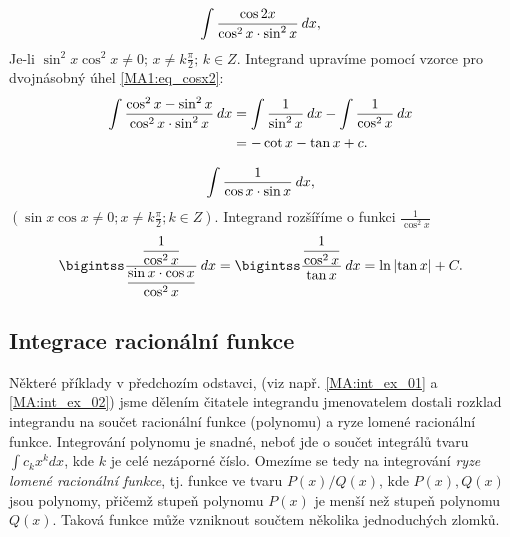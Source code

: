 {\begin{example}
      \end{example}
      
      \begin{example}
        \begin{equation}\label{MA:int_ex_07} 
          \int\frac{\cos2x}{\cos^2x\cdot\sin^2x}\hspace{2pt}dx, 
        \end{equation} 
        Je-li \(\sin^2x\cos^2x\neq0;\, x\neq k\frac{\pi}{2};\, k\in Z\).
        Integrand upravíme pomocí vzorce pro dvojnásobný úhel \ref{MA1:eq_cosx2}:
        \begin{align*}
          \int\frac{\cos^2x-\sin^2x}{\cos^2x\cdot\sin^2x}\hspace{2pt}dx 
             &= \int\frac{1}{\sin^2x}\hspace{2pt}dx -\int\frac{1}{\cos^2x}\hspace{2pt}dx        \\
             &= -\cot x - \tan x + c. 
        \end{align*}
      \end{example}
      
      \begin{example}
       \begin{equation}\label{MA:int_ex_08}
         \int\frac{1}{\cos x\cdot\sin x}\hspace{2pt}dx, 
       \end{equation}
       \((\sin x\cos x\neq0; x\neq k\frac{\pi}{2}; k\in Z)\).
       Integrand rozšíříme o funkci $\displaystyle{\frac{1}{\cos^2x}}$
        \begin{equation*}
          \bigintss\dfrac{\dfrac{1}{\cos^2x}}{\dfrac{\sin x\cdot\cos x}{\cos^2x}} \dx = 
          \bigintss\dfrac{\dfrac{1}{\cos^2x}}{\tan x}\dx = \ln\abs{\tan x} + C.
        \end{equation*}            
      \end{example}
  
    \subsection{Integrace racionální funkce}
      Některé příklady v předchozím odstavci, (viz např. \ref{MA:int_ex_01} a 
      \ref{MA:int_ex_02}) jsme dělením čitatele integrandu jmenovatelem dostali rozklad
      integrandu na součet racionální funkce (polynomu) a ryze lomené racionální funkce.
      Integrování polynomu je snadné, neboť jde o součet integrálů tvaru $\int c_kx^k dx$, kde
      $k$ je celé nezáporné číslo. Omezíme se tedy na integrování \emph{ryze lomené racionální
      funkce},  tj. funkce ve tvaru $P(x)/Q(x)$, kde $P(x), Q(x)$ jsou polynomy, přičemž stupeň
      polynomu $P(x)$ je menší než stupeň polynomu $Q(x)$. Taková funkce může vzniknout součtem
      několika jednoduchých zlomků.
      
}
